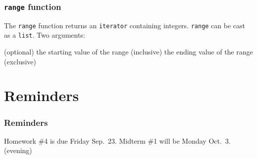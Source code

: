 \documentclass[11pt]{beamer}
\begin{document}
\begin{frame}[fragile]
  \frametitle{\texttt{range} function}
  \Enlarge

  \begin{itemize}
  \myitem  The \texttt{range} function returns an \texttt{iterator} containing integers. %
  \myitem  \texttt{range} can be cast as a \texttt{list}. %
  \myitem  Two arguments:
    \begin{itemize}
    \mysubitem  (optional) the starting value of the range (inclusive)
    \mysubitem  the ending value of the range (exclusive)
    \end{itemize}
  \end{itemize}
\end{frame}

\section{Reminders}

\begin{frame}
  \frametitle{Reminders}
  \Enlarge

  \begin{itemize}
  \myitem  Homework \#4 is due Friday Sep.\ 23.
  \myitem  Midterm \#1 will be Monday Oct.\ 3.  (evening)
  \end{itemize}
\end{frame}
\end{document}
